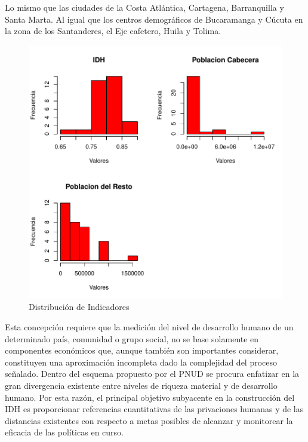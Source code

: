Lo mismo que las ciudades de la Costa Atlántica, Cartagena, Barranquilla y Santa Marta. Al igual que los centros demográficos de Bucaramanga y Cúcuta en la zona de los Santanderes, el Eje cafetero, Huila y Tolima.

\begin{figure}[h]
\includegraphics{univariada-hist}
\caption{Distribución de Indicadores}
\label{hist}
\end{figure}

Esta concepción requiere que la medición del nivel de desarrollo humano de un determinado país, comunidad o grupo social, no se base solamente en componentes económicos que, aunque también son importantes considerar, constituyen una aproximación incompleta dado la complejidad del proceso señalado. Dentro del esquema propuesto por el PNUD se procura enfatizar en la gran divergencia existente entre niveles de riqueza material y de desarrollo humano. Por esta razón, el principal objetivo subyacente en la construcción del IDH es proporcionar referencias cuantitativas de las privaciones humanas y de las distancias existentes con respecto a metas posibles de alcanzar y monitorear la eficacia de las políticas en curso. 


